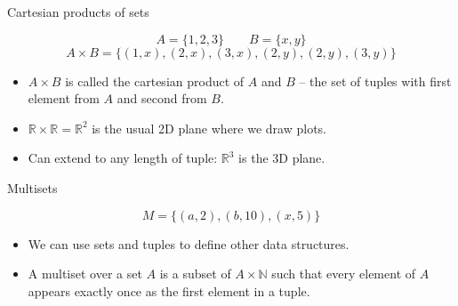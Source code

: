 \begin{frame}[fragile]{Cartesian products of sets}
  \begin{topdisp}
    $$A = \{1,2,3\} \qquad B = \{x,y\}$$
    $$A \times B = \{(1,x),(2,x),(3,x),(2,y),(2,y),(3,y)\}$$
  \end{topdisp}
  
  \begin{itemize}
    \item $A \times B$ is called the cartesian product of $A$ and $B$ -- the set of tuples with first element from $A$ and second from $B$.
    \item $\mathbb{R} \times \mathbb{R} = \mathbb{R}^2$ is the usual 2D plane where we draw plots.
    \item Can extend to any length of tuple: $\mathbb{R}^3$ is the 3D plane.
  \end{itemize}

  \begin{center}
    \hspace{5mm}
  \end{center}
\end{frame}

\begin{frame}[fragile]{Multisets}
  \begin{topdisp}
    $$M = \{(a, 2), (b, 10), (x,5) \}$$
  \end{topdisp}
  \begin{itemize}
    \setlength\itemsep{3mm}
    \item We can use sets and tuples to define other data structures.
    \item A multiset over a set $A$ is a subset of $A \times \mathbb{N}$ such that every element of $A$ appears exactly once as the first element in a tuple.
  \end{itemize}
\end{frame}